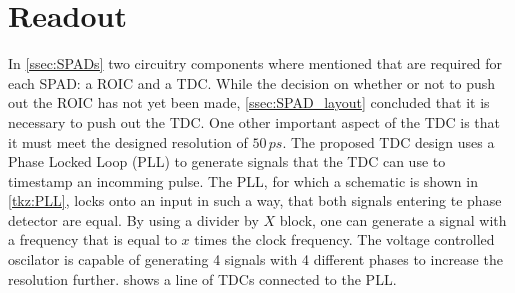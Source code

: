 \section{Readout}\label{ssec:readout}
In \cref{ssec:SPADs} two circuitry components where mentioned that are required for each SPAD: a ROIC and a TDC. While the decision on whether or not to push out the ROIC has not yet been made, \cref{ssec:SPAD_layout} concluded that it is necessary to push out the TDC. One other important aspect of the TDC is that it must meet the designed resolution of $50\,ps$. The proposed TDC design uses a Phase Locked Loop (PLL) to generate signals that the TDC can use to timestamp an incomming pulse. The PLL, for which a schematic is shown in \cref{tkz:PLL}, locks onto an input in such a way, that both signals entering te phase detector are equal. By using a divider by $X$ block, one can generate a signal with a frequency that is equal to $x$ times the clock frequency. The voltage controlled oscilator is capable of generating 4 signals with 4 different phases to increase the resolution further.  shows a line of TDCs connected to the PLL.




